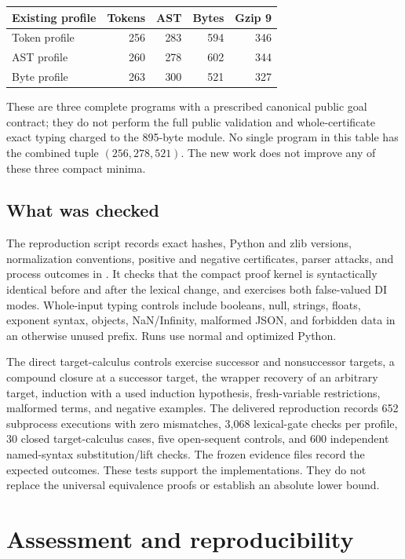 \documentclass[11pt,a4paper]{article}
\theoremstyle{definition}\newtheorem{definition}[theorem]{Definition}
\begin{document}
\begin{center}\small
\begin{tabular}{lrrrr}
\toprule
Existing profile & Tokens & AST & Bytes & Gzip 9\\
\midrule
Token profile & 256 & 283 & 594 & 346\\
AST profile & 260 & 278 & 602 & 344\\
Byte profile & 263 & 300 & 521 & 327\\
\bottomrule
\end{tabular}
\end{center}
These are three complete programs with a prescribed canonical public
goal contract; they do not perform the full public validation and
whole-certificate exact typing charged to the 895-byte module. No
single program in this table has the combined tuple $(256,278,521)$.
The new work does not improve any of these three compact minima.

\subsection{What was checked}

The reproduction script records exact hashes, Python and zlib versions,
normalization conventions, positive and negative certificates, parser
attacks, and process outcomes in . It checks that the
compact proof kernel is syntactically identical before and after the
lexical change, and exercises both false-valued DI modes. Whole-input
typing controls include booleans, null, strings, floats, exponent syntax,
objects, NaN/Infinity, malformed JSON, and forbidden data in an otherwise
unused prefix. Runs use normal and optimized Python.

The direct target-calculus controls exercise successor and nonsuccessor
targets, a compound closure at a successor target, the wrapper recovery
of an arbitrary target, induction with a used induction hypothesis,
fresh-variable restrictions, malformed terms, and negative examples.
The delivered reproduction records 652 subprocess executions with zero
mismatches, 3,068 lexical-gate checks per profile, 30 closed target-calculus
cases, five open-sequent controls, and 600 independent named-syntax
substitution/lift checks. The frozen evidence files record the expected
outcomes. These tests support the implementations. They do not replace
the universal equivalence proofs or establish an absolute lower bound.

\section{Assessment and reproducibility}
\label{sec:assessment}
\end{document}

